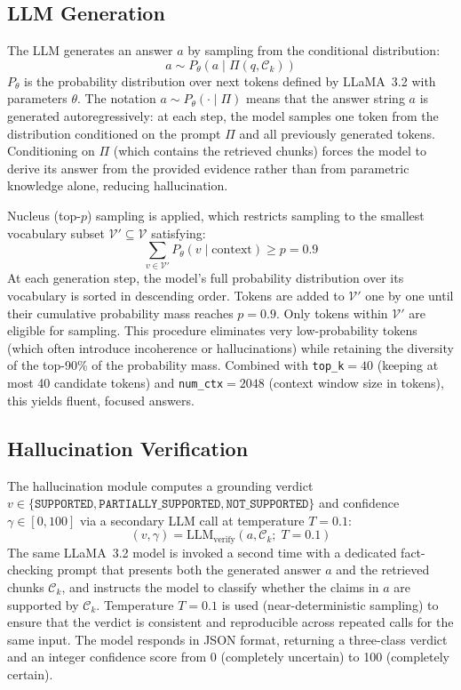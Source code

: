 \documentclass[conference]{IEEEtran}
\begin{document}
\subsection{LLM Generation}
The LLM generates an answer $a$ by sampling from the conditional
distribution:
\begin{equation}
  a \sim P_\theta\!\left(a \mid \Pi(q,\mathcal{C}_k)\right)
  \label{eq:gen}
\end{equation}
$P_\theta$ is the probability distribution over next tokens defined by
LLaMA~3.2 with parameters $\theta$.
The notation $a \sim P_\theta(\cdot \mid \Pi)$ means that the answer
string $a$ is generated autoregressively: at each step, the model
samples one token from the distribution conditioned on the prompt $\Pi$
and all previously generated tokens.
Conditioning on $\Pi$ (which contains the retrieved chunks) forces the
model to derive its answer from the provided evidence rather than
from parametric knowledge alone, reducing hallucination.

Nucleus (top-$p$) sampling is applied, which restricts sampling to the
smallest vocabulary subset $\mathcal{V}' \subseteq \mathcal{V}$
satisfying:
\begin{equation}
  \sum_{v \in \mathcal{V}'} P_\theta(v \mid \mathrm{context}) \geq p = 0.9
  \label{eq:nucleus}
\end{equation}
At each generation step, the model's full probability distribution over
its vocabulary is sorted in descending order.
Tokens are added to $\mathcal{V}'$ one by one until their cumulative
probability mass reaches $p=0.9$.
Only tokens within $\mathcal{V}'$ are eligible for sampling.
This procedure eliminates very low-probability tokens (which often
introduce incoherence or hallucinations) while retaining the diversity
of the top-90\% of the probability mass.
Combined with \texttt{top\_k}$=40$ (keeping at most 40 candidate
tokens) and \texttt{num\_ctx}$=2048$ (context window size in tokens),
this yields fluent, focused answers.

\subsection{Hallucination Verification}
The hallucination module computes a grounding verdict
$v \in \{\texttt{SUPPORTED},\allowbreak
        \texttt{PARTIALLY\_SUPPORTED},\allowbreak
        \texttt{NOT\_SUPPORTED}\}$
and confidence $\gamma \in [0,100]$ via a secondary LLM call at
temperature $T=0.1$:
\begin{equation}
  (v,\gamma) = \mathrm{LLM}_{\mathrm{verify}}(a,\mathcal{C}_k;\; T=0.1)
  \label{eq:halluc}
\end{equation}
The same LLaMA~3.2 model is invoked a second time with a dedicated
fact-checking prompt that presents both the generated answer $a$ and
the retrieved chunks $\mathcal{C}_k$, and instructs the model to
classify whether the claims in $a$ are supported by $\mathcal{C}_k$.
Temperature $T=0.1$ is used (near-deterministic sampling) to ensure
that the verdict is consistent and reproducible across repeated calls
for the same input.
The model responds in JSON format, returning a three-class verdict and
an integer confidence score from 0 (completely uncertain) to 100
(completely certain).
\end{document}
